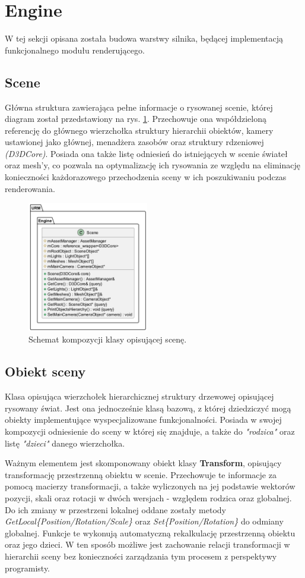	
\section{Engine}
	W tej sekcji opisana została budowa warstwy silnika, będącej implementacją funkcjonalnego modułu renderującego.
	
\subsection{Scene}
	Główna struktura zawierająca pełne informacje o rysowanej scenie, której diagram został przedstawiony na rys. \ref{UML_Scene}. Przechowuje ona współdzieloną referencję do głównego wierzchołka struktury hierarchii obiektów, kamery ustawionej jako głównej, menadżera zasobów oraz struktury rdzeniowej \textit{(D3DCore)}. Posiada ona także listę odniesień do istniejących w scenie świateł oraz mesh'y, co pozwala na optymalizację ich rysowania ze względu na eliminację konieczności każdorazowego przechodzenia sceny w ich poszukiwaniu podczas renderowania.
	
	\begin{figure}[h!]
		\centering
		\includegraphics[width=200px]{images/UML/scene.png}
		\caption{Schemat kompozycji klasy opisującej scenę.}
		\label{UML_Scene}
	\end{figure}
	
	
\subsection{Obiekt sceny}
	Klasa opisująca wierzchołek hierarchicznej struktury drzewowej opisującej rysowany świat. Jest ona jednocześnie klasą bazową, z której dziedziczyć mogą obiekty implementujące wyspecjalizowane funkcjonalności. Posiada w swojej kompozycji odniesienie do sceny w której się znajduje, a także do \textit{"rodzica"} oraz listę \textit{"dzieci"} danego wierzchołka. 
	
	Ważnym elementem jest skomponowany obiekt klasy \textbf{Transform}, opisujący transformację przestrzenną obiektu w scenie. Przechowuje te informacje za pomocą macierzy transformacji, a także wyliczonych na jej podstawie wektorów pozycji, skali oraz rotacji w dwóch wersjach - względem rodzica oraz globalnej. Do ich zmiany w przestrzeni lokalnej oddane zostały metody \textit{GetLocal\{Position/Rotation/Scale\}} oraz \textit{Set\{Position/Rotation\}} do odmiany globalnej. Funkcje te wykonują automatyczną rekalkulację przestrzenną obiektu oraz jego dzieci. W ten sposób możliwe jest zachowanie relacji transformacji w hierarchii sceny bez konieczności zarządzania tym procesem z perspektywy programisty.
	
